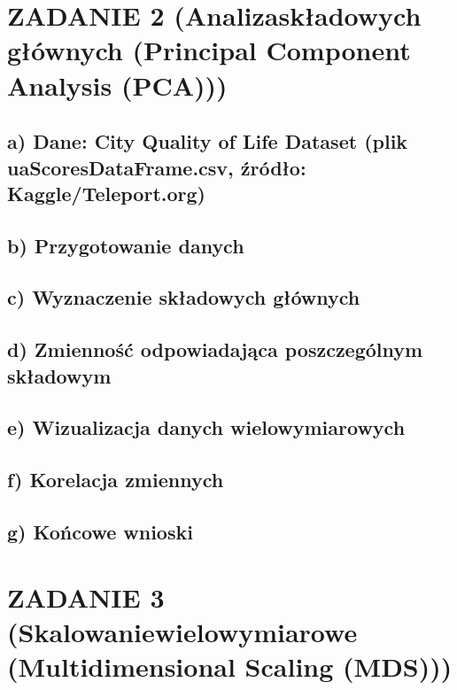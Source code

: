 \documentclass[
  12pt,
]{article}
\begin{document}
\section{ZADANIE 2 (Analizaskładowych głównych (Principal Component
Analysis
(PCA)))}\label{zadanie-2-analizaskux142adowych-gux142uxf3wnych-principal-component-analysis-pca}

\subsection{a) Dane: City Quality of Life Dataset (plik
uaScoresDataFrame.csv, źródło:
Kaggle/Teleport.org)}\label{a-dane-city-quality-of-life-dataset-plik-uascoresdataframe.csv-ux17aruxf3dux142o-kaggleteleport.org}

\subsection{b) Przygotowanie danych}\label{b-przygotowanie-danych}

\subsection{c) Wyznaczenie składowych
głównych}\label{c-wyznaczenie-skux142adowych-gux142uxf3wnych}

\subsection{d) Zmienność odpowiadająca poszczególnym
składowym}\label{d-zmiennoux15bux107-odpowiadajux105ca-poszczeguxf3lnym-skux142adowym}

\subsection{e) Wizualizacja danych
wielowymiarowych}\label{e-wizualizacja-danych-wielowymiarowych}

\subsection{f) Korelacja zmiennych}\label{f-korelacja-zmiennych}

\subsection{g) Końcowe wnioski}\label{g-koux144cowe-wnioski}

\section{ZADANIE 3 (Skalowaniewielowymiarowe (Multidimensional Scaling
(MDS)))}\label{zadanie-3-skalowaniewielowymiarowe-multidimensional-scaling-mds}
\end{document}
